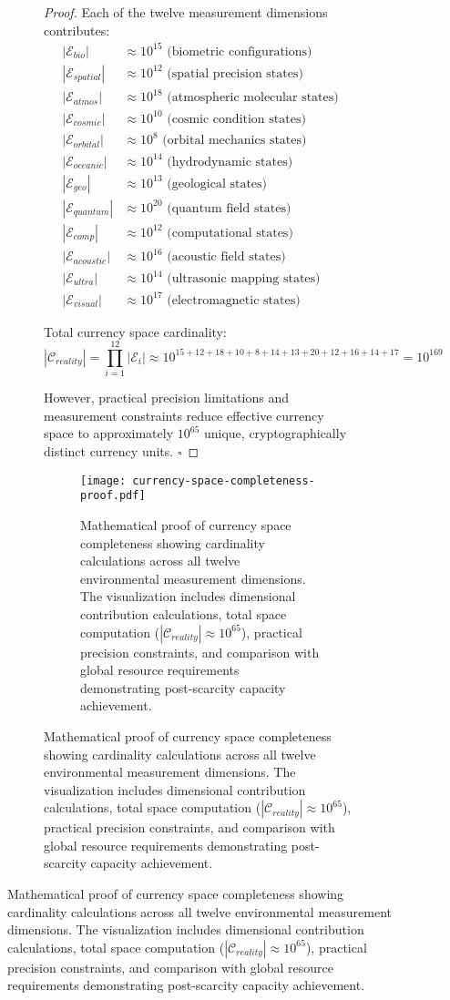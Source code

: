 \documentclass[12pt,a4paper]{article}
\begin{document}
\begin{figure}[H]
\begin{figure}[H]
\begin{proof}
Each of the twelve measurement dimensions contributes:
\begin{align}
|\mathcal{E}_{bio}| &\approx 10^{15} \text{ (biometric configurations)} \\
|\mathcal{E}_{spatial}| &\approx 10^{12} \text{ (spatial precision states)} \\
|\mathcal{E}_{atmos}| &\approx 10^{18} \text{ (atmospheric molecular states)} \\
|\mathcal{E}_{cosmic}| &\approx 10^{10} \text{ (cosmic condition states)} \\
|\mathcal{E}_{orbital}| &\approx 10^{8} \text{ (orbital mechanics states)} \\
|\mathcal{E}_{oceanic}| &\approx 10^{14} \text{ (hydrodynamic states)} \\
|\mathcal{E}_{geo}| &\approx 10^{13} \text{ (geological states)} \\
|\mathcal{E}_{quantum}| &\approx 10^{20} \text{ (quantum field states)} \\
|\mathcal{E}_{comp}| &\approx 10^{12} \text{ (computational states)} \\
|\mathcal{E}_{acoustic}| &\approx 10^{16} \text{ (acoustic field states)} \\
|\mathcal{E}_{ultra}| &\approx 10^{14} \text{ (ultrasonic mapping states)} \\
|\mathcal{E}_{visual}| &\approx 10^{17} \text{ (electromagnetic states)}
\end{align}

Total currency space cardinality:
\begin{equation}
|\mathcal{C}_{reality}| = \prod_{i=1}^{12} |\mathcal{E}_i| \approx 10^{15+12+18+10+8+14+13+20+12+16+14+17} = 10^{169}
\end{equation}

However, practical precision limitations and measurement constraints reduce effective currency space to approximately $10^{65}$ unique, cryptographically distinct currency units. $\square$
\end{proof}

\begin{figure}[H]
\centering
\texttt{[image: currency-space-completeness-proof.pdf]}
\caption{Mathematical proof of currency space completeness showing cardinality calculations across all twelve environmental measurement dimensions. The visualization includes dimensional contribution calculations, total space computation ($|\mathcal{C}_{reality}| ≈ 10^{65}$), practical precision constraints, and comparison with global resource requirements demonstrating post-scarcity capacity achievement.}
\label{fig:currency_space_completeness}
\end{figure}


\end{figure}
\end{figure}
\end{document}
